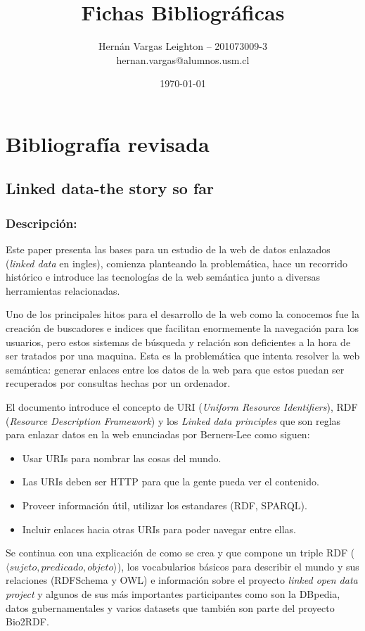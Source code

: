 \documentclass[spanish, fleqn]{article}
\title{Fichas Bibliográficas}
\author{Hernán Vargas Leighton -- 201073009-3 \\ hernan.vargas@alumnos.usm.cl}
\date{\today}
\begin{document}
\maketitle
\thispagestyle{empty}
\thispagestyle{fancy}

\section{Bibliografía revisada}
\subsection{Linked data-the story so far\cite{bizer2009linked}}
\subsubsection*{Descripción:}
Este paper presenta las bases para un estudio de la web de datos enlazados
(\emph{linked data} en ingles), comienza planteando la problemática, hace un
recorrido histórico e introduce las tecnologías de la web semántica junto a
diversas herramientas relacionadas.

Uno de los principales hitos para el desarrollo de la web como la conocemos fue
la creación de buscadores e indices que facilitan enormemente la navegación para
los usuarios, pero estos sistemas de búsqueda y relación son deficientes a la
hora de ser tratados por una maquina. Esta es la problemática que intenta
resolver la web semántica: generar enlaces entre los datos de la web para que
estos puedan ser recuperados por consultas hechas por un ordenador.

El documento introduce el concepto de URI (\emph{Uniform Resource Identifiers}),
RDF (\emph{Resource Description Framework}) y los \emph{Linked data principles}
que son reglas para enlazar datos en la web enunciadas por 
Berners-Lee\cite{berners2011linked} como siguen:
\begin{itemize}
    \item Usar URIs para nombrar las cosas del mundo.
    \item Las URIs deben ser HTTP para que la gente pueda ver el contenido.
    \item Proveer información útil, utilizar los estandares (RDF, SPARQL).
    \item Incluir enlaces hacia otras URIs para poder navegar entre ellas.
\end{itemize}

Se continua con una explicación de como se crea y que compone un triple RDF 
($\langle sujeto, predicado, objeto \rangle$), los vocabularios básicos para
describir el mundo y sus relaciones (RDFSchema y OWL) e información sobre el
proyecto \emph{linked open data project} y algunos de sus más importantes
participantes como son la DBpedia, datos gubernamentales y varios datasets que
también son parte del proyecto Bio2RDF.
\end{document}
